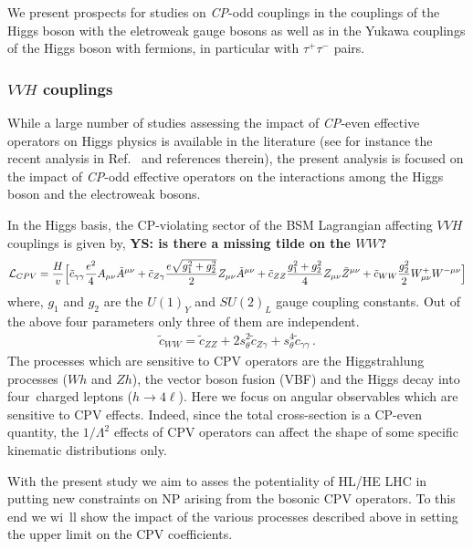 \documentclass[../report.tex]{subfiles}
\begin{document}
 We present prospects for studies on {\it CP}-odd couplings in the
 couplings of the Higgs boson with the eletroweak gauge bosons
 as well as in the Yukawa couplings of the Higgs boson with
 fermions, in particular with $\tau^+ \tau^-$ pairs.

\subsubsection{$VVH$ couplings}
While a large number of studies assessing the impact of {\it CP}-even
effective operators on Higgs physics is available in the literature
(see for instance the recent analysis in Ref.~\cite{Boselli:2017pef} and
references therein),
the present analysis is focused on the impact of {\it CP}-odd effective operators
on the interactions among the Higgs boson and the electroweak bosons.

In the Higgs basis, the CP-violating sector of the BSM Lagrangian affecting $VVH$ couplings is given by, {\bf YS: is there a missing tilde on the $WW$?}
%                                   
\begin{align}
\mathcal{L}_{CPV} =  \frac{H}{v} \Big[
\tilde{c}_{\gamma\gamma} \frac{e^2}{4} A_{\mu\nu}\tilde{A}^{\mu\nu}
+ \tilde{c}_{Z\gamma} \frac{e\sqrt{g_1^2 + g_2^2}}{2} Z_{\mu\nu}\tilde{A}^{\mu\nu}
+ \tilde{c}_{ZZ} \frac{g_1^2 + g_2^2}{4} Z_{\mu\nu}\tilde{Z}^{\mu\nu} + \tilde{c}_{WW} \frac{g_2^2}{2} W^+_{\mu\nu}W^{-\mu\nu}\Big]
\label{eqn:Hvv}
\end{align}
%
where, $g_1$ and $g_2$ are the $U(1)_Y$  and  $SU(2)_L$ gauge coupling constants. Out of the above four
parameters only three of them  are independent.
\begin{align}
 \tilde{c}_{WW} = \tilde{c}_{ZZ} + 2s_\theta^2 \tilde{c}_{Z\gamma} + s_\theta^4 \tilde{c}_{\gamma\gamma} \, .
\end{align}
The processes which are sensitive to CPV operators are the Higgstrahlung processes ($Wh$ and $Zh$), the vector boson fusion (VBF) and the Higgs decay into four\
 charged leptons ($h\to4\ell$). Here we focus on angular observables which are sensitive to CPV effects. Indeed, since the total cross-section is a CP-even quantity,  the $1/\Lambda^2$ effects of CPV operators can affect the shape of some specific kinematic distributions only.

With the present study we aim to asses the potentiality of HL/HE LHC in putting new constraints on NP arising from the bosonic CPV operators. To this end we wi\
ll show the impact of the
various processes described above in setting the upper limit on the CPV coefficients.
\end{document}
